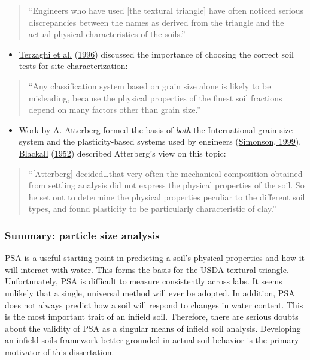 \documentclass[
  letterpaper,
  openany]{book}
\providecommand{\tightlist}{%
  \setlength{\itemsep}{0pt}\setlength{\parskip}{0pt}}
\renewenvironment{leftbar}{\def\FrameCommand{\color{grey30}\vrule width 1pt \hspace{10pt}}\MakeFramed {\advance\hsize-\width \FrameRestore}}{\endMakeFramed}
\renewenvironment{quote}%
{\begin{leftbar} \begin{quotation} \noindent \small }%
{\end{quotation}\end{leftbar}}
\begin{document}
\begin{quote}
``Engineers who have used {[}the textural triangle{]} have often noticed serious discrepancies between the names as derived from the triangle and the actual physical characteristics of the soils.''
\end{quote}

\begin{itemize}
\tightlist
\item
  \protect\hyperlink{ref-Terzaghi1996}{Terzaghi et al.} (\protect\hyperlink{ref-Terzaghi1996}{1996}) discussed the importance of choosing the correct soil tests for site characterization:
\end{itemize}

\begin{quote}
``Any classification system based on grain size alone is likely to be misleading, because the physical properties of the finest soil fractions depend on many factors other than grain size.''
\end{quote}

\begin{itemize}
\tightlist
\item
  Work by A. Atterberg formed the basis of \emph{both} the International grain-size system and the plasticity-based systems used by engineers (\protect\hyperlink{ref-Simonson1999}{Simonson, 1999}). \protect\hyperlink{ref-Blackall1952}{Blackall} (\protect\hyperlink{ref-Blackall1952}{1952}) described Atterberg's view on this topic:
\end{itemize}

\begin{quote}
``{[}Atterberg{]} decided\ldots that very often the mechanical composition obtained from settling analysis did not express the physical properties of the soil. So he set out to determine the physical properties peculiar to the different soil types, and found plasticity to be particularly characteristic of clay.''
\end{quote}

\hypertarget{summary-particle-size-analysis}{%
\subsubsection{Summary: particle size analysis}\label{summary-particle-size-analysis}}

PSA is a useful starting point in predicting a soil's physical properties and how it will interact with water.
This forms the basis for the USDA textural triangle.
Unfortunately, PSA is difficult to measure consistently across labs. It seems unlikely that a single, universal method will ever be adopted.
In addition, PSA does not always predict how a soil will respond to changes in water content.
This is the most important trait of an infield soil.
Therefore, there are serious doubts about the validity of PSA as a singular means of infield soil analysis.
Developing an infield soils framework better grounded in actual soil behavior is the primary motivator of this dissertation.
\end{document}
